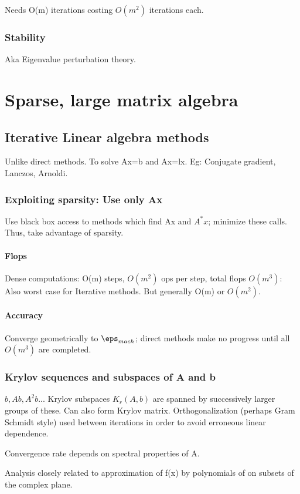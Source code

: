 \documentclass[oneside, article]{memoir}
\begin{document}
Needs O(m) iterations costing $O(m^{2})$ iterations each. \why

\section{Stability}
Aka Eigenvalue perturbation theory.

\part{Sparse, large matrix algebra}
\chapter{Iterative Linear algebra methods}
Unlike direct methods. To solve Ax=b and Ax=lx. Eg: Conjugate gradient, Lanczos, Arnoldi.

\section{Exploiting sparsity: Use only Ax}
Use black box access to methods which find Ax and $A^{*}x$; minimize these calls. Thus, take advantage of sparsity.

\subsection{Flops}
Dense computations: O(m) steps, $O(m^{2})$ ops per step, total flops $O(m^{3})$: Also worst case for Iterative methods. But generally O(m) or $O(m^{2})$.

\subsection{Accuracy}
Converge geometrically to $\eps_{mach}$; direct methods make no progress until all $O(m^{3})$ are completed.

\section{Krylov sequences and subspaces of A and b}
$b, Ab, A^{2}b ..$. Krylov subspaces $K_{r}(A, b)$ are spanned by successively larger groups of these. Can also form Krylov matrix. Orthogonalization (perhaps Gram Schmidt style) used between iterations in order to avoid erroneous linear dependence.

Convergence rate depends on spectral properties of A.

Analysis closely related to approximation of f(x) by polynomials of on subsets of the complex plane. \why
\end{document}
